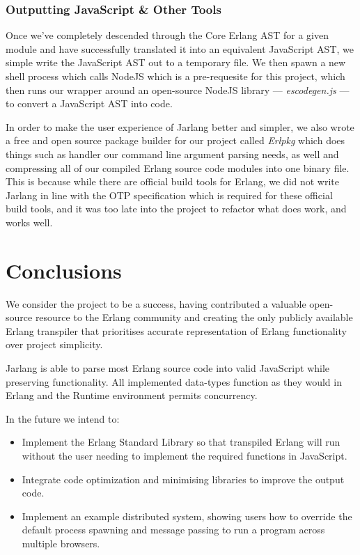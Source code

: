 \documentclass[twoside,12pt,titlepage,a4paper]{article}
\newcommand\blankpage{%
    \null
    \thispagestyle{empty}%
    \addtocounter{page}{-1}%
    \newpage}
\begin{document}
\subsubsection{Outputting JavaScript \& Other Tools}
Once we've completely descended through the Core Erlang AST for a given module and have successfully translated it into an equivalent JavaScript AST, we simple write the JavaScript AST out to a temporary file. We then spawn a new shell process which calls NodeJS which is a pre-requesite for this project, which then runs our wrapper around an open-source NodeJS library --- \textit{escodegen.js} \citep{escodegenGitHub} --- to convert a JavaScript AST into code.

In order to make the user experience of Jarlang better and simpler, we also wrote a free and open source package builder for our project called \textit{Erlpkg} \citep{erlpkgGitHub} which does things such as handler our command line argument parsing needs, as well and compressing all of our compiled Erlang source code modules into one binary file. This is because while there are official build tools for Erlang, we did not write Jarlang in line with the OTP specification which is required for these official build tools, and it was too late into the project to refactor what does work, and works well.

\blankpage
\section{Conclusions}
\label{Conclusions}
We consider the project to be a success, having contributed a valuable open-source resource to the Erlang community and creating the only publicly available Erlang transpiler that prioritises accurate representation of Erlang functionality over project simplicity.

Jarlang is able to parse most Erlang source code into valid JavaScript while preserving functionality. All implemented data-types function as they would in Erlang and the Runtime environment permits concurrency.

In the future we intend to:
\begin{itemize}
	\item Implement the Erlang Standard Library so that transpiled Erlang will run without the user needing to implement the required functions in JavaScript.
	\item Integrate code optimization and minimising libraries to improve the output code.
	\item Implement an example distributed system, showing users how to override the default process spawning and message passing to run a program across multiple browsers.
\end{itemize} 
\end{document}

